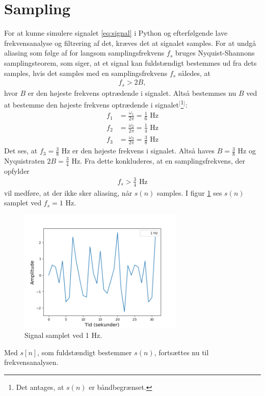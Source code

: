 \section{Sampling}
For at kunne simulere signalet \eqref{eq:signal} i Python og efterfølgende lave frekvensanalyse og filtrering af det, kræves det at signalet samples. 
For at undgå aliasing som følge af for langsom samplingsfrekvens $f_s$ bruges Nyquist-Shannons samplingsteorem, som siger, at et signal kan fuldstændigt bestemmes ud fra dets samples, hvis det samples med en samplingsfrekvens $f_s$ således, at
\begin{align}
f_s>2B,
\end{align}
hvor $B$ er den højeste frekvens optrædende i signalet. Altså bestemmes nu $B$ ved at bestemme den højeste frekvens optrædende i signalet$^[$\footnote{Det antages, at $s(n)$ er båndbegrænset.}$^]$:
\begin{align*}
f_1&=\frac{\omega_1}{2\pi}=\frac{1}{6}\text{ Hz}\\
f_2&=\frac{\omega_2}{2\pi}=\frac{1}{4}\text{ Hz}\\
f_3&=\frac{\omega_3}{2\pi}=\frac{3}{8}\text{ Hz}
\end{align*}
Det ses, at $f_3=\frac{3}{8}$ Hz er den højeste frekvens i signalet. Altså haves $B=\frac{3}{8}$ Hz og Nyquistraten $2B=\frac{3}{4}$ Hz. Fra dette konkluderes, at en samplingsfrekvens, der opfylder
\begin{align}
f_s>\frac{3}{4}\text{ Hz}
\end{align}
vil medføre, at der ikke sker aliasing, når $s(n)$ samples. I figur \ref{fig:s_sampled} ses $s(n)$ samplet ved $f_s=1$ Hz.
\begin{figure}[H]
\centering
\includegraphics[width=0.7\textwidth]{figures/signal_1hz}
\caption{Signal samplet ved 1 Hz.}
\label{fig:s_sampled}
\end{figure}
Med $s[n]$, som fuldstændigt bestemmer $s(n)$, fortsættes nu til frekvensanalysen.